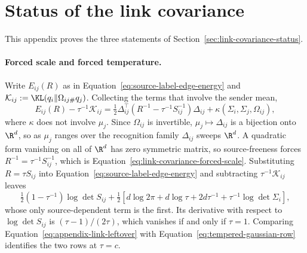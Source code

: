 \section{Status of the link covariance}
\label{sec:link-covariance-status-proofs}

This appendix proves the three statements of Section~\ref{sec:link-covariance-status}.

\paragraph{Forced scale and forced temperature.} Write \(E_{ij}(R)\) as in Equation~\eqref{eq:source-label-edge-energy} and \(\mathcal K_{ij}:=\KL(q_i\Vert\Omega_{ij\#}q_j)\). Collecting the terms that involve the sender mean,
\begin{equation}
E_{ij}(R)-\tau^{-1}\mathcal K_{ij}
=\tfrac12\Delta_{ij}^\top\left(R^{-1}-\tau^{-1}S_{ij}^{-1}\right)\Delta_{ij}+\kappa\left(\Sigma_i,\Sigma_j,\Omega_{ij}\right),
\label{eq:appendix-link-mean-split}
\end{equation}
where \(\kappa\) does not involve \(\mu_j\). Since \(\Omega_{ij}\) is invertible, \(\mu_j\mapsto\Delta_{ij}\) is a bijection onto \(\R^d\), so as \(\mu_j\) ranges over the recognition family \(\Delta_{ij}\) sweeps \(\R^d\). A quadratic form vanishing on all of \(\R^d\) has zero symmetric matrix, so source-freeness forces \(R^{-1}=\tau^{-1}S_{ij}^{-1}\), which is Equation~\eqref{eq:link-covariance-forced-scale}. Substituting \(R=\tau S_{ij}\) into Equation~\eqref{eq:source-label-edge-energy} and subtracting \(\tau^{-1}\mathcal K_{ij}\) leaves
\begin{equation}
\tfrac12\left(1-\tau^{-1}\right)\log\det S_{ij}
+\tfrac12\left[d\log2\pi+d\log\tau+2d\tau^{-1}+\tau^{-1}\log\det\Sigma_i\right],
\label{eq:appendix-link-leftover}
\end{equation}
whose only source-dependent term is the first. Its derivative with respect to \(\log\det S_{ij}\) is \((\tau-1)/(2\tau)\), which vanishes if and only if \(\tau=1\). Comparing Equation~\eqref{eq:appendix-link-leftover} with Equation~\eqref{eq:tempered-gaussian-row} identifies the two rows at \(\tau=c\).

